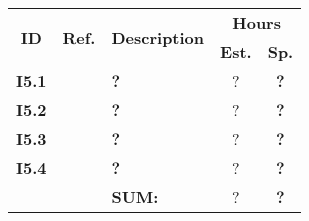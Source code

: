   \label{tab:sprint5stories}
 \def\arraystretch{1.25}
 
\begin{longtable}{ccXcc}

\toprule[0.5mm]
\multirow{2}{*}{\textbf{ID}} &
\multirow{2}{*}{\textbf{Ref.}} & \multirow{2}{*}{\textbf{Description}} & \multicolumn{2}{c}{\textbf{Hours}} \\
 					& & & \textbf{Est.} & \textbf{Sp.} \\
\midrule
\textbf{I5.1} 	& 	& {\bf ?}	& ?	& \textbf{?} \\

\textbf{I5.2} 	& 	& {\bf ?}	& ?	& \textbf{?} \\

\textbf{I5.3} 	& 	& {\bf ?} 	& ? & \textbf{?} \\	

\textbf{I5.4} 	& 	& {\bf ?} 	& ? & \textbf{?} \\
	
\midrule
		
				&& \textbf{SUM:}		&		?	& \textbf{?}
 \\																			
\bottomrule[0.5mm]
\end{longtable}
